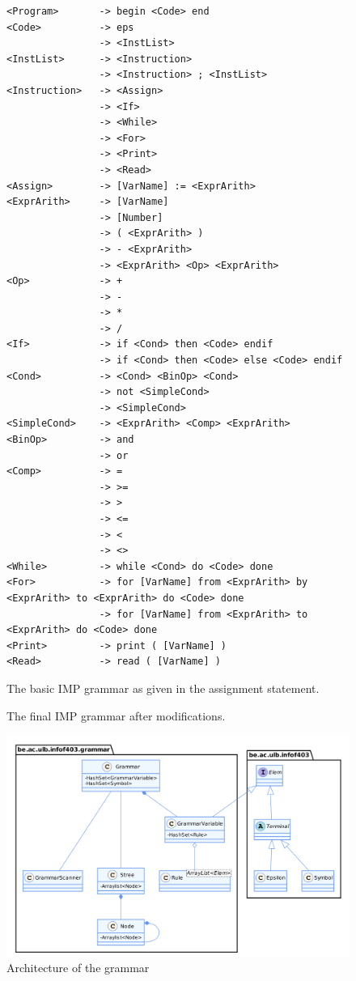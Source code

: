 \documentclass[a4paper,11pt]{article}
\begin{document}
    \begin{figure}[h!]
      \centering
      \begin{lstlisting}
<Program>       -> begin <Code> end
<Code>          -> eps
                -> <InstList>
<InstList>      -> <Instruction>
                -> <Instruction> ; <InstList>
<Instruction>   -> <Assign>
                -> <If>
                -> <While>
                -> <For>
                -> <Print>
                -> <Read>
<Assign>        -> [VarName] := <ExprArith>
<ExprArith>     -> [VarName]
                -> [Number]
                -> ( <ExprArith> )
                -> - <ExprArith>
                -> <ExprArith> <Op> <ExprArith>
<Op>            -> +
                -> -
                -> *
                -> /
<If>            -> if <Cond> then <Code> endif
                -> if <Cond> then <Code> else <Code> endif
<Cond>          -> <Cond> <BinOp> <Cond>
                -> not <SimpleCond>
                -> <SimpleCond>
<SimpleCond>    -> <ExprArith> <Comp> <ExprArith>
<BinOp>         -> and
                -> or
<Comp>          -> = 
                -> >= 
                -> > 
                -> <= 
                -> < 
                -> <> 
<While>         -> while <Cond> do <Code> done
<For>           -> for [VarName] from <ExprArith> by <ExprArith> to <ExprArith> do <Code> done
                -> for [VarName] from <ExprArith> to <ExprArith> do <Code> done
<Print>         -> print ( [VarName] )
<Read>          -> read ( [VarName] )
      \end{lstlisting}
      \caption{The basic IMP grammar as given in the assignment statement.}
      \label{fig:basicimpgrammar}
    \end{figure}
  
  \begin{figure}[h!]
    \centering
    
    \caption{The final IMP grammar after modifications.}
    \label{fig:finalimpgrammar}
  \end{figure}

  \begin{figure}
    \centering
    \includegraphics[width=\textwidth]{./img/class_grammar.png}
    \caption{Architecture of the grammar}
    \label{fig:grammararchitecture}
  \end{figure}
  
\end{document}
